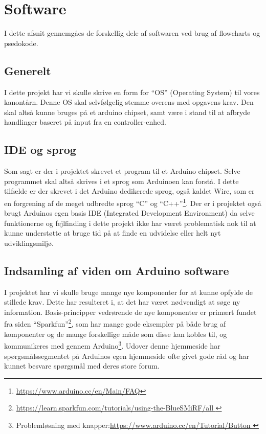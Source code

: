 \section{Software}
I dette afsnit gennemgåes de forskellig dele af softwaren ved brug af flowcharts og psedokode.

\subsection{Generelt}
I dette projekt har vi skulle skrive en form for “OS” (Operating System) til vores kanontårn. Denne OS skal selvfølgelig stemme overens med opgavens krav. Den skal altså kunne bruges på et arduino chipset, samt være i stand til at afbryde handlinger baseret på input fra en controller-enhed.

\subsection{IDE og sprog}
Som sagt er der i projektet skrevet et program til et Arduino chipset. Selve programmet skal altså skrives i et sprog som Arduinoen kan forstå. I dette tilfælde er der skrevet i det Arduino dedikerede sprog, også kaldet Wire, som er en forgrening af de meget udbredte sprog “C” og “C++”\footnote{\url{ https://www.arduino.cc/en/Main/FAQ}}. Der er i projektet også brugt Arduinos egen basis IDE (Integrated Development Environment) da selve funktionerne og fejlfinding i dette projekt ikke har været problematisk nok til at kunne understøtte at bruge tid på at finde en udvidelse eller helt nyt udviklingsmiljø.

\subsection{Indsamling af viden om Arduino software}
I projektet har vi skulle bruge mange nye komponenter for at kunne opfylde de stillede krav. Dette har resulteret i, at det har været nødvendigt at søge ny information. Basis-principper vedrørende de nye komponenter er primært fundet fra siden “Sparkfun”\footnote{\url{https://learn.sparkfun.com/tutorials/using-the-BlueSMiRF/all }}, som har mange gode eksempler på både brug af komponenter og de mange forskellige måde som disse kan kobles til, og kommunikeres med gennem Arduino\footnote{Problemløsning med knapper:\url{https://www.arduino.cc/en/Tutorial/Button
}}. Udover denne hjemmeside har spørgsmålssegmentet på Arduinos egen hjemmeside ofte givet gode råd og har kunnet besvare spørgsmål med deres store forum.


